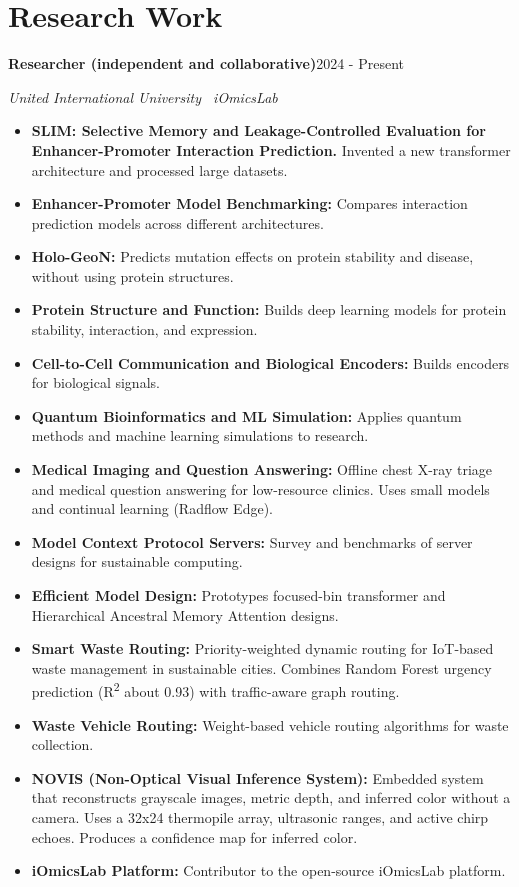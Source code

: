 \documentclass[10pt,a4paper]{article}
\newcommand{\entry}[2]{\needspace{3\baselineskip}\textbf{#1}\hfill #2\par}
\newcommand{\sub}[1]{\textit{#1}\par}
\begin{document}
\section{Research Work}
\entry{Researcher (independent and collaborative)}{2024 - Present}
\sub{United International University \textbullet\ iOmicsLab}
\begin{itemize}
  \item \textbf{SLIM: Selective Memory and Leakage-Controlled Evaluation for Enhancer-Promoter Interaction Prediction.} Invented a new transformer architecture and processed large datasets.
  \item \textbf{Enhancer-Promoter Model Benchmarking:} Compares interaction prediction models across different architectures.
  \item \textbf{Holo-GeoN:} Predicts mutation effects on protein stability and disease, without using protein structures.
  \item \textbf{Protein Structure and Function:} Builds deep learning models for protein stability, interaction, and expression.
  \item \textbf{Cell-to-Cell Communication and Biological Encoders:} Builds encoders for biological signals.
  \item \textbf{Quantum Bioinformatics and ML Simulation:} Applies quantum methods and machine learning simulations to research.
  \item \textbf{Medical Imaging and Question Answering:} Offline chest X-ray triage and medical question answering for low-resource clinics. Uses small models and continual learning (Radflow Edge).
  \item \textbf{Model Context Protocol Servers:} Survey and benchmarks of server designs for sustainable computing.
  \item \textbf{Efficient Model Design:} Prototypes focused-bin transformer and Hierarchical Ancestral Memory Attention designs.
  \item \textbf{Smart Waste Routing:} Priority-weighted dynamic routing for IoT-based waste management in sustainable cities. Combines Random Forest urgency prediction (R\textsuperscript{2} about 0.93) with traffic-aware graph routing.
  \item \textbf{Waste Vehicle Routing:} Weight-based vehicle routing algorithms for waste collection.
  \item \textbf{NOVIS (Non-Optical Visual Inference System):} Embedded system that reconstructs grayscale images, metric depth, and inferred color without a camera. Uses a 32x24 thermopile array, ultrasonic ranges, and active chirp echoes. Produces a confidence map for inferred color.
  \item \textbf{iOmicsLab Platform:} Contributor to the open-source iOmicsLab platform.
\end{itemize}
\end{document}
